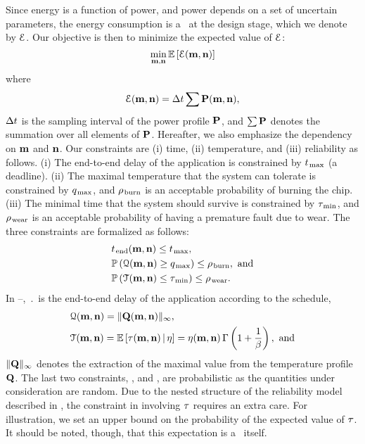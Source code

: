 Since energy is a function of power, and power depends on a set of uncertain parameters, the energy consumption is a \rv\ at the design stage, which we denote by $\qoiE$.
Our objective is then to minimize the expected value of $\qoiE$:
\begin{equation} \elab{objective}
  \min_{\mapping, \priority} \expectation{\qoiE(\mapping, \priority)}
\end{equation}
where
\[
  \qoiE(\mapping, \priority) = \dt \sum \mP(\mapping, \priority),
\]
$\dt$ is the sampling interval of the power profile $\mP$, and $\sum \mP$ denotes the summation over all elements of $\mP$.
Hereafter, we also emphasize the dependency on $\mapping$ and $\priority$.
Our constraints are (i) time, (ii) temperature, and (iii) reliability as follows.
(i) The end-to-end delay of the application is constrained by $\t_\maximal$ (a deadline).
(ii) The maximal temperature that the system can tolerate is constrained by $\q_\maximal$, and $\pr_\burn$ is an acceptable probability of burning the chip.
(iii) The minimal time that the system should survive is constrained by $\T_\minimal$, and $\pr_\wear$ is an acceptable probability of having a premature fault due to wear.
The three constraints are formalized as follows:
\begin{align}
  & \period(\mapping, \priority) \leq \t_\maximal, \elab{timing-constraint} \\
  & \probabilityMeasure\left( \qoiQ(\mapping, \priority) \geq \q_\maximal \right) \leq \pr_\burn, \text{ and} \elab{thermal-constraint} \\
  & \probabilityMeasure\left( \qoiT(\mapping, \priority) \leq \T_\minimal \right) \leq \pr_\wear. \elab{reliability-constraint}
\end{align}
In --, $\period$ is the end-to-end delay of the application according to the schedule,
\begin{align*}
  & \qoiQ(\mapping, \priority) = \norm[\infty]{\mQ(\mapping, \priority)}, \\
  & \qoiT(\mapping, \priority) = \expectation{\T(\mapping, \priority) \, | \, \eta} = \eta(\mapping, \priority) \, \Gamma\left(1 + \frac{1}{\beta}\right), \text{ and}
\end{align*}
$\norm[\infty]{\mQ}$ denotes the extraction of the maximal value from the temperature profile $\mQ$.
The last two constraints, \ie,  and , are probabilistic as the quantities under consideration are random.
Due to the nested structure of the reliability model described in , the constraint in  involving $\T$ requires an extra care.
For illustration, we set an upper bound on the probability of the expected value of $\T$.
It should be noted, though, that this expectation is a \rv\ itself.

